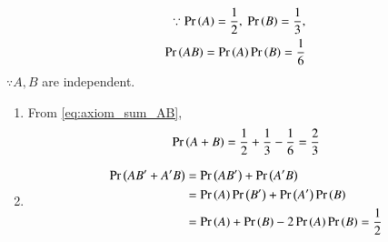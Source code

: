 \begin{align}
	\because
\Pr\left(A\right) = \frac{1}{2},\ \Pr\left(B\right) = \frac{1}{3},
\\
          \Pr\left(AB\right) = \Pr\left(A\right)\Pr\left(B\right)=\frac{1}{6}
\end{align}
     $\because A,B$ are independent.
 \begin{enumerate}
 \item     From  
\eqref{eq:axiom_sum_AB},
     \begin{align}
 \Pr\left(A+B\right)          
          = \frac{1}{2} + \frac{1}{3} -\frac{1}{6} = \frac{2}{3}
          \end{align}
               \item 
               \begin{align}
		       \Pr\left(AB^{\prime}+A^{\prime}B\right)&=
                     \Pr\left(AB^{\prime}\right)+\Pr\left(A^{\prime}B\right)
		     \\
                    &= \Pr\left(A\right)\Pr\left(B^{\prime}\right)+\Pr\left(A^{\prime}\right)\Pr\left(B\right)
		    \\
                    &= \Pr\left(A\right)+\Pr\left(B\right)-2\Pr\left(A\right)\Pr\left(B\right) = 
                     \frac{1}{2}
               \end{align}
 \end{enumerate}

      

